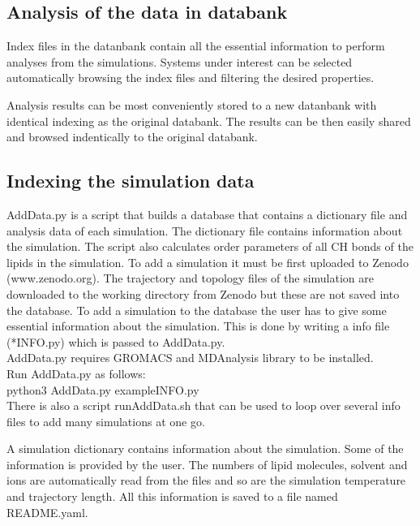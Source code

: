 \documentclass[fleqn,10pt]{wlscirep}
\begin{document}
\subsection{Analysis of the data in databank}

Index files in the datanbank contain all the essential information to perform analyses from the simulations. Systems under interest can be selected automatically browsing the index files and filtering the desired properties. 

Analysis results can be most conveniently stored to a new datanbank with identical indexing as the original databank. The results can be then easily shared and browsed indentically to the original databank.

\subsection{Indexing the simulation data}

AddData.py is a script that builds a database that contains a dictionary file and analysis data of each simulation. The dictionary file contains information about the simulation. The script also calculates order parameters of all CH bonds of the lipids in the simulation. To add a simulation it must be first uploaded to Zenodo (www.zenodo.org). The trajectory and topology files of the simulation are downloaded to the working directory from Zenodo but these are not saved into the database. To add a simulation to the database the user has to give some essential information about the simulation. This is done by writing a info file (*INFO.py) which is passed to AddData.py. 
\newline \\
AddData.py requires GROMACS and MDAnalysis library to be installed.
\newline \\
Run AddData.py as follows:
\newline \\
python3 AddData.py exampleINFO.py
\newline \\
There is also a script runAddData.sh that can be used to loop over several info files to add many simulations at one go.

A simulation dictionary contains information about the simulation. Some of the information is provided by the user. The numbers of lipid molecules, solvent and ions are automatically read from the files and so are the simulation temperature and trajectory length. All this information is saved to a file named README.yaml.
\end{document}
